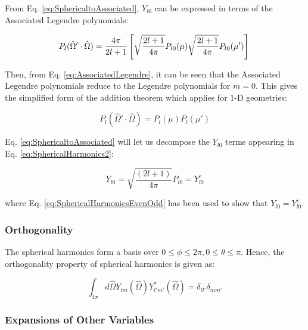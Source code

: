 \documentclass[10pt]{article}
\begin{document}
\begin{flushleft}
\begin{tcolorbox}[breakable]
From Eq. \eqref{eq:SphericaltoAssociated}, \(Y_{l0}\) can be expressed in terms of the Associated Legendre polynomials:

\begin{equation}
\label{eq:SphericalHarmonics4}
P_l(\hat{\Omega}'\cdot\hat{\Omega})=\frac{4\pi}{2l+1}\left\lbrack \sqrt{\frac{2l+1}{4\pi}}P_{l0}(\mu)\sqrt{\frac{2l+1}{4\pi}}P_{l0}(\mu')\right\rbrack\\
\end{equation}

Then, from Eq. \eqref{eq:AssociatedLegendre}, it can be seen that the Associated Legendre polynomials reduce to the Legendre polynomials for \(m=0\). This gives the simplified form of the addition theorem which applies for 1-D geometries:

\begin{equation}
\label{eq:AddSpherical1D}
P_l(\hat{\Omega}'\cdot\hat{\Omega})=P_{l}(\mu)P_{l}(\mu')
\end{equation}

\end{tcolorbox}



Eq. \eqref{eq:SphericaltoAssociated} will let us decompose the \(Y_{l0}\) terms appearing in Eq. \eqref{eq:SphericalHarmonics2}:

\begin{equation}
Y_{l0}=\sqrt{\frac{(2l+1)}{4\pi}}P_{l0}= Y_{l0}^e
\end{equation}

where Eq. \eqref{eq:SphericalHarmonicsEvenOdd} has been used to show that \(Y_{l0}=Y_{l0}^e\).



\subsubsection{Orthogonality}
The spherical harmonics form a basis over \(0\leq\phi\leq2\pi, 0\leq\theta\leq\pi\). Hence, the orthogonality property of spherical harmonics is given as:

\begin{equation}
\label{eq:SHOrthogonality}
\int_{4\pi}^{} d\hat{\Omega} Y_{lm}(\hat{\Omega}) Y_{l'm'}^{*}(\hat{\Omega}) = \delta_{ll'}\delta_{mm'}
\end{equation}



\subsubsection{Expansions of Other Variables}


\end{flushleft}
\end{document}
